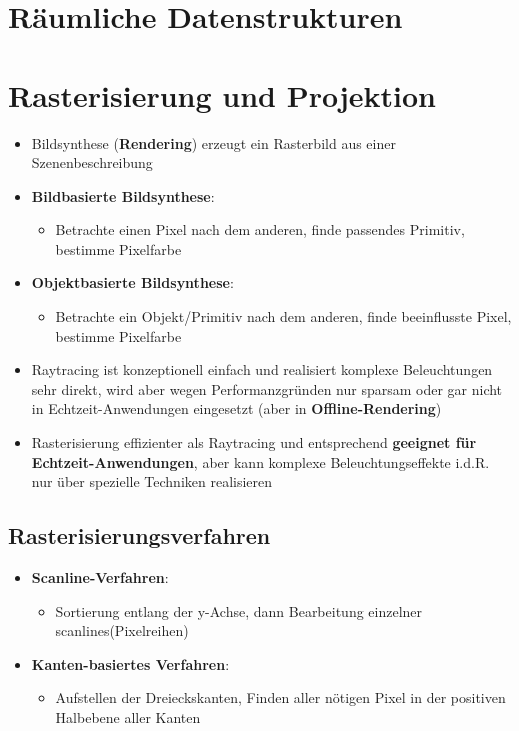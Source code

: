 \documentclass[10pt,a4paper]{article}
\begin{document}
	\newpage
	\section{Räumliche Datenstrukturen}
	\label{sec:raeumliche_datenstrukturen}

	\newpage
	\section{Rasterisierung und Projektion}
	\label{sec:rasterisierung_und_projektion}

	\begin{itemize}
		\item Bildsynthese (\textbf{Rendering}) erzeugt ein Rasterbild aus einer Szenenbeschreibung
		\item \textbf{Bildbasierte Bildsynthese}:
		\begin{itemize}
			\item Betrachte einen Pixel nach dem anderen, finde passendes Primitiv, bestimme Pixelfarbe
		\end{itemize}
		\item \textbf{Objektbasierte Bildsynthese}:
		\begin{itemize}
			\item Betrachte ein Objekt/Primitiv nach dem anderen, finde beeinflusste Pixel, bestimme Pixelfarbe
		\end{itemize}
		\item Raytracing ist konzeptionell einfach und realisiert komplexe Beleuchtungen sehr direkt, wird aber wegen Performanzgründen nur sparsam oder gar nicht in Echtzeit-Anwendungen eingesetzt (aber in \textbf{Offline-Rendering})
		\item Rasterisierung effizienter als Raytracing und entsprechend \textbf{geeignet für Echtzeit-Anwendungen}, aber kann komplexe Beleuchtungseffekte i.d.R. nur über spezielle Techniken realisieren
	\end{itemize}

	\subsection{Rasterisierungsverfahren}
	\label{sub:rasterisierungsverfahren}
	
	\begin{itemize}
		\item \textbf{Scanline-Verfahren}:
		\begin{itemize}
			\item Sortierung entlang der y-Achse, dann Bearbeitung einzelner \glqq scanlines\grqq (Pixelreihen)
		\end{itemize}
		\item \textbf{Kanten-basiertes Verfahren}:
		\begin{itemize}
			\item Aufstellen der Dreieckskanten, Finden aller nötigen Pixel in der positiven Halbebene aller Kanten
		\end{itemize}
	\end{itemize}
\end{document}

